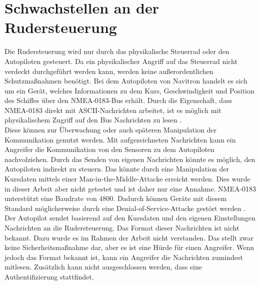 \section{Schwachstellen an der Rudersteuerung}
Die Rudersteuerung wird nur durch das physikalische Steuerrad oder den Autopiloten gesteuert. Da ein physikalischer
Angriff auf das Steuerrad nicht verdeckt durchgeführt werden kann, werden keine außerordentlichen Schutzmaßnahmen benötigt.
Bei dem Autopiloten von Navitron handelt es sich um ein Gerät, welches Informationen zu dem Kurs, Geschwindigkeit und
Position des Schiffes über den NMEA-0183-Bus erhält. Durch die Eigenschaft, dass NMEA-0183 direkt mit ASCII-Nachrichten
arbeitet, ist es möglich mit physikalischem Zugriff auf den Bus Nachrichten zu lesen \cite{nmea0183}. \\
Diese können zur Überwachung oder auch späteren Manipulation der Kommunikation genutzt werden. Mit aufgezeichneten Nachrichten
kann ein Angreifer die Kommunikation von den Sensoren zu dem Autopiloten nachvolziehen. Durch das Senden von eigenen Nachrichten
könnte es möglich, den Autopiloten indirekt zu steuern. Das könnte durch eine Manipulation der Kursdaten mittels einer Man-in-the-Middle-Attacke
erreicht werden. Dies wurde in dieser Arbeit aber nicht getestet und ist daher nur eine Annahme. 
NMEA-0183 unterstützt eine Baudrate von 4800. Dadurch können Geräte mit diesem Standard möglicherweise durch eine 
Denial-of-Service-Attacke gestört werden \cite{Tran2021}.
Der Autopilot sendet basierend auf den Kursdaten und den eigenen Einstellungen Nachrichten an die Rudersteuerung. 
Das Format dieser Nachrichten ist nicht bekannt. Dazu wurde es im Rahmen der Arbeit nicht verstanden.
Das stellt zwar keine Sicherheitsmaßnahme dar, aber es ist eine Hürde für einen Angreifer. Wenn jedoch 
das Format bekannt ist, kann ein Angreifer die Nachrichten zumindest mitlesen. Zusätzlich kann
nicht ausgeschlossen werden, dass eine Authentifizierung stattfindet.\\


